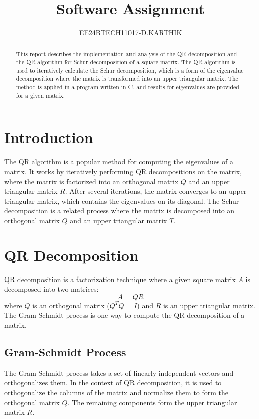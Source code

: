 \documentclass[journal]{IEEEtran}
\begin{document}

\vspace{3cm}

\title{Software Assignment}
\author{EE24BTECH11017-D.KARTHIK}
\maketitle

\renewcommand{\thefigure}{\theenumi}
\renewcommand{\thetable}{\theenumi}


\begin{abstract}
    This report describes the implementation and analysis of the QR decomposition and the QR algorithm for Schur decomposition of a square matrix. The QR algorithm is used to iteratively calculate the Schur decomposition, which is a form of the eigenvalue decomposition where the matrix is transformed into an upper triangular matrix. The method is applied in a program written in C, and results for eigenvalues are provided for a given matrix.
\end{abstract}



\section{Introduction}
The QR algorithm is a popular method for computing the eigenvalues of a matrix. It works by iteratively performing QR decompositions on the matrix, where the matrix is factorized into an orthogonal matrix \(Q\) and an upper triangular matrix \(R\). After several iterations, the matrix converges to an upper triangular matrix, which contains the eigenvalues on its diagonal. The Schur decomposition is a related process where the matrix is decomposed into an orthogonal matrix \(Q\) and an upper triangular matrix \(T\).

\section{QR Decomposition}
QR decomposition is a factorization technique where a given square matrix \(A\) is decomposed into two matrices:
\[
A = QR
\]
where \(Q\) is an orthogonal matrix (\(Q^T Q = I\)) and \(R\) is an upper triangular matrix. The Gram-Schmidt process is one way to compute the QR decomposition of a matrix.

\subsection{Gram-Schmidt Process}
The Gram-Schmidt process takes a set of linearly independent vectors and orthogonalizes them. In the context of QR decomposition, it is used to orthogonalize the columns of the matrix and normalize them to form the orthogonal matrix \(Q\). The remaining components form the upper triangular matrix \(R\).
\end{document}
